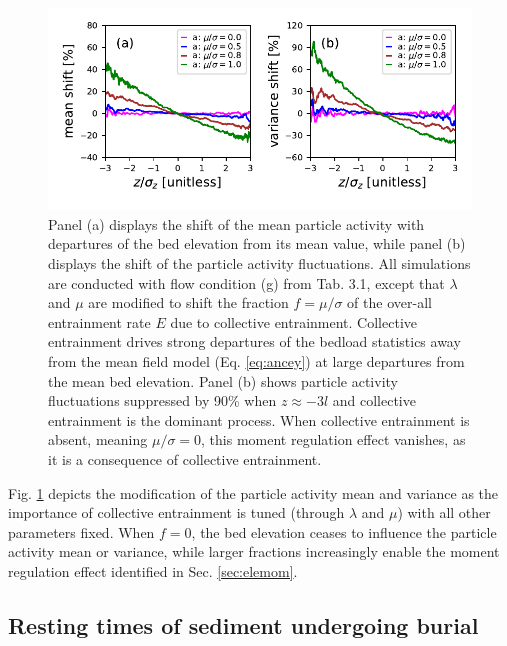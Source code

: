 \begin{figure}[!htbp]
	\includegraphics[width=\linewidth,keepaspectratio]{./figures/ch3/colent-suppression.pdf}
	\caption{Panel (a) displays the shift of the mean particle activity with departures of the bed elevation from its mean value, while panel (b) displays the shift of the particle activity fluctuations. All simulations are conducted with flow condition (g) from Tab. 3.1, except that $\lambda$ and $\mu$ are modified to shift the fraction $f=\mu/\sigma$ of the over-all entrainment rate $E$ due to collective entrainment. Collective entrainment drives strong departures of the bedload statistics away from the mean field model (Eq. \ref{eq:ancey}) at large departures from the mean bed elevation. Panel (b) shows particle activity fluctuations suppressed by 90\% when $z\approx -3l$ and collective entrainment is the dominant process. When collective entrainment is absent, meaning $\mu/\sigma=0$, this moment regulation effect vanishes, as it is a consequence of collective entrainment.}
	\label{fig:colent}
\end{figure}
Fig. \ref{fig:colent} depicts the modification of the particle activity mean and variance as the importance of collective entrainment is tuned (through $\lambda$ and $\mu$) with all other parameters fixed. When $f=0$, the bed elevation ceases to influence the particle activity mean or variance, while larger fractions increasingly enable the moment regulation effect identified in Sec. \ref{sec:elemom}.

\subsection{Resting times of sediment undergoing burial}
\label{sec:elertcdf}

